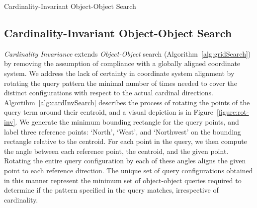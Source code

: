 \begin{algorithm}[h]
    \caption{Cardinality-Invariant Object-Object Search}\label{alg:cardInvSearch}
    \begin{algorithmic}
        \State{- - - - -}
             
                    \EndIf
                \EndFor
            \EndFor
        \EndProcedure
    \end{algorithmic}
\end{algorithm}

\subsection{Cardinality-Invariant Object-Object Search}
\textit{Cardinality Invariance} extends \textit{Object-Object} search (Algorithm~\ref{alg:gridSearch}) by removing the assumption of compliance with a globally aligned coordinate system.
%
We address the lack of certainty in coordinate system alignment by rotating the query pattern the minimal number of times needed to cover the distinct configurations with respect to the actual cardinal directions.
%
Algortihm~\ref{alg:cardInvSearch} describes the process of rotating the points of the query term around their centroid, and a visual depiction is in Figure~\ref{figure:rot-inv}.
We generate the minimum bounding rectangle for the query points, and label three reference points: `North', `West', and `Northwest' on the bounding rectangle relative to the centroid. 
For each point in the query, we then compute the angle between each reference point, the centroid, and the given point. 
Rotating the entire query configuration by each of these angles aligns the given point to each reference direction.
The unique set of query configurations obtained in this manner represent the minimum set of object-object queries required to determine if the pattern specified in the query matches, irrespective of cardinality. 